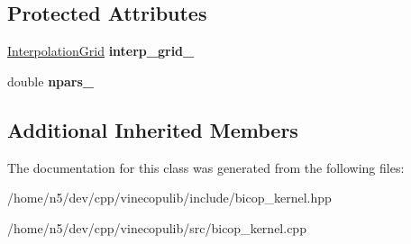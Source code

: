 \subsection*{Protected Attributes}
\begin{DoxyCompactItemize}
\item 
\hyperlink{classvinecopulib_1_1_interpolation_grid}{Interpolation\+Grid} {\bfseries interp\+\_\+grid\+\_\+}\hypertarget{classvinecopulib_1_1_kernel_bicop_aa8cfe1dd0786d692562252de05c46588}{}\label{classvinecopulib_1_1_kernel_bicop_aa8cfe1dd0786d692562252de05c46588}

\item 
double {\bfseries npars\+\_\+}\hypertarget{classvinecopulib_1_1_kernel_bicop_a1b49a0a2630e71079c08ebdca79b06b6}{}\label{classvinecopulib_1_1_kernel_bicop_a1b49a0a2630e71079c08ebdca79b06b6}

\end{DoxyCompactItemize}
\subsection*{Additional Inherited Members}


The documentation for this class was generated from the following files\+:\begin{DoxyCompactItemize}
\item 
/home/n5/dev/cpp/vinecopulib/include/bicop\+\_\+kernel.\+hpp\item 
/home/n5/dev/cpp/vinecopulib/src/bicop\+\_\+kernel.\+cpp\end{DoxyCompactItemize}

